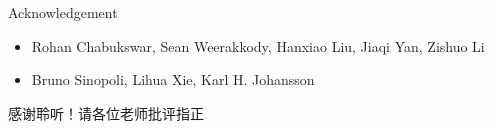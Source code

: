 \documentclass[10pt]{beamer}
\begin{document}
\begin{frame}{Acknowledgement}
  \begin{itemize}
  \item Rohan Chabukswar, Sean Weerakkody, Hanxiao Liu, Jiaqi Yan, Zishuo Li
  \item Bruno Sinopoli, Lihua Xie, Karl H. Johansson
  \end{itemize}
\end{frame}


\begin{frame}[standout]
  感谢聆听！请各位老师批评指正
\end{frame}
\end{document}
